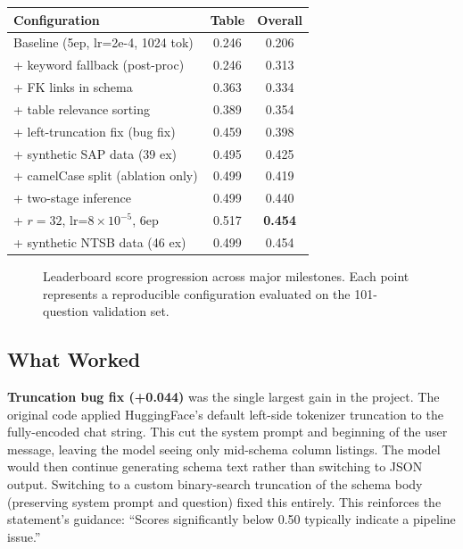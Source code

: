\documentclass[10pt,twocolumn]{article}
\begin{document}
\begin{center}
\small
\begin{tabular}{@{}lcc@{}}
\toprule
Configuration & Table & Overall \\
\midrule
Baseline (5ep, lr=2e-4, 1024 tok) & 0.246 & 0.206 \\
+ keyword fallback (post-proc) & 0.246 & 0.313 \\
+ FK links in schema & 0.363 & 0.334 \\
+ table relevance sorting & 0.389 & 0.354 \\
+ left-truncation fix (bug fix) & 0.459 & 0.398 \\
+ synthetic SAP data (39 ex) & 0.495 & 0.425 \\
+ camelCase split (ablation only) & 0.499 & 0.419 \\
+ two-stage inference & 0.499 & 0.440 \\
+ $r=32$, lr=$8\times10^{-5}$, 6ep & 0.517 & \textbf{0.454} \\
+ synthetic NTSB data (46 ex) & 0.499 & 0.454 \\
\bottomrule
\end{tabular}
\end{center}

\begin{figure}[h]
\centering
{}
\caption{Leaderboard score progression across major milestones. Each point represents a reproducible configuration evaluated on the 101-question validation set.}
\label{fig:progress}
\end{figure}

\subsection*{What Worked}

\textbf{Truncation bug fix (+0.044)} was the single largest gain in the project. The original code applied HuggingFace's default left-side tokenizer truncation to the fully-encoded chat string. This cut the system prompt and beginning of the user message, leaving the model seeing only mid-schema column listings. The model would then continue generating schema text rather than switching to JSON output. Switching to a custom binary-search truncation of the schema body (preserving system prompt and question) fixed this entirely. This reinforces the statement's guidance: ``Scores significantly below 0.50 typically indicate a pipeline issue.''
\end{document}

